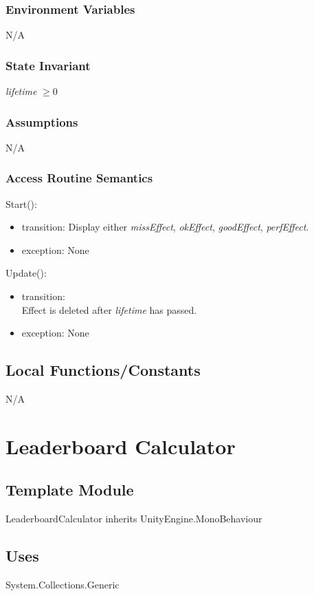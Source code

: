 \documentclass[12pt]{article}
\begin{document}
\subsubsection{Environment Variables}
N/A

\subsubsection{State Invariant}
\textit{lifetime} $\geq 0$

\subsubsection{Assumptions}
N/A

\subsubsection{Access Routine Semantics}
\noindent Start():
\begin{itemize}
	\item transition: Display either \textit{missEffect}, \textit{okEffect}, \textit{goodEffect}, \textit{perfEffect}.
	\item exception: None
\end{itemize}
\noindent Update():
\begin{itemize}
	\item transition:\\
	    Effect is deleted after \textit{lifetime} has passed.
	\item exception: None
\end{itemize}

\subsection{Local Functions/Constants}
N/A

\newpage

\section{Leaderboard Calculator}

\subsection{Template Module}
LeaderboardCalculator inherits UnityEngine.MonoBehaviour

\subsection{Uses}
System.Collections.Generic
\end{document}
